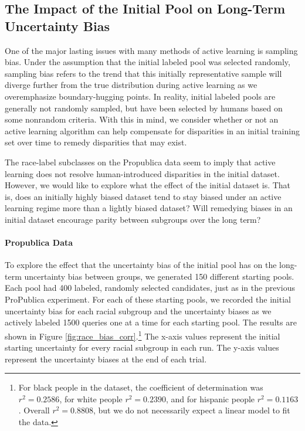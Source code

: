 \subsection{The Impact of the Initial Pool on Long-Term Uncertainty Bias}
One of the major lasting issues with many methods of active learning is sampling bias. Under the assumption that the initial labeled pool was selected randomly, sampling bias refers to the trend that this initially representative sample will diverge further from the true distribution during active learning as we overemphasize boundary-hugging points. In reality, initial labeled pools are generally not randomly sampled, but have been selected by humans based on some nonrandom criteria. With this in mind, we consider whether or not an active learning algorithm can help compensate for disparities in an initial training set over time to remedy disparities that may exist.

The race-label subclasses on the Propublica data seem to imply that active learning does not resolve human-introduced disparities in the initial dataset. However, we would like to explore what the effect of the initial dataset is. That is, does an initially highly biased dataset tend to stay biased under an active learning regime more than a lightly biased dataset? Will remedying biases in an initial dataset encourage parity between subgroups over the long term? 


\paragraph{Propublica Data}
To explore the effect that the uncertainty bias of the initial pool has on the long-term uncertainty bias between groups, we generated 150 different starting pools. Each pool had 400 labeled, randomly selected candidates, just as in the previous ProPublica experiment. For each of these starting pools, we recorded the initial uncertainty bias for each racial subgroup and the uncertainty biases as we actively labeled 1500 queries one at a time for each starting pool. The results are shown in Figure \ref{fig:race_bias_corr}.\footnote{For black people in the dataset, the coefficient of determination was $r^2=  0.2586$, for white people $r^2= 0.2390$, and for hispanic people $r^2= 0.1163$. Overall $r^2= 0.8808$, but we do not necessarily expect a linear model to fit the data.} The x-axis values represent the initial starting uncertainty for every racial subgroup in each run. The y-axis values represent the uncertainty biases at the end of each trial. 


